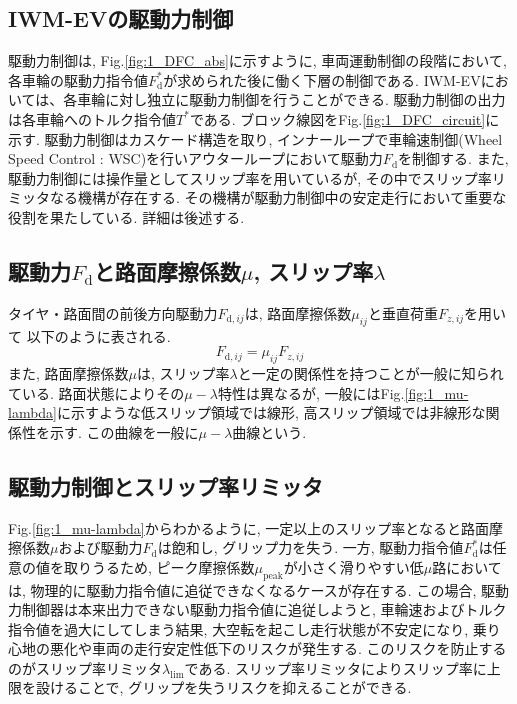 \documentclass[11pt,a4paper,oneside,onecolumn,fleqn,dvipdfmx]{jsarticle}
\begin{document}
\subsection{IWM-EVの駆動力制御}
駆動力制御は, Fig.\ref{fig:1_DFC_abs}に示すように, 車両運動制御の段階において, 各車輪の駆動力指令値$F_\mathrm{d}^*$が求められた後に働く下層の制御である.
IWM-EVにおいては、各車輪に対し独立に駆動力制御を行うことができる.
駆動力制御の出力は各車輪へのトルク指令値$T^*$である. 
ブロック線図をFig.\ref{fig:1_DFC_circuit}に示す. 駆動力制御はカスケード構造を取り, インナーループで車輪速制御(Wheel Speed Control : WSC)を行いアウターループにおいて駆動力$F_\mathrm{d}$を制御する.
また, 駆動力制御には操作量としてスリップ率を用いているが, その中でスリップ率リミッタなる機構が存在する. その機構が駆動力制御中の安定走行において重要な役割を果たしている. 詳細は後述する.

\subsection{駆動力$F_\mathrm{d}$と路面摩擦係数$\mu$, スリップ率$\lambda$}
タイヤ・路面間の前後方向駆動力$F_{\mathrm{d},ij}$は, 路面摩擦係数$\mu_{ij}$と垂直荷重$F_{z,ij}$を用いて
以下のように表される.
\begin{equation}
    \label{eq:1_Fd}
    F_{\mathrm{d},ij} = \mu_{ij} F_{z,ij}
\end{equation}
また, 路面摩擦係数$\mu$は, スリップ率$\lambda$と一定の関係性を持つことが一般に知られている. 
路面状態によりその$\mu-\lambda$特性は異なるが, 一般にはFig.\ref{fig:1_mu-lambda}に示すような低スリップ領域では線形, 高スリップ領域では非線形な関係性を示す. 
この曲線を一般に$\mu-\lambda$曲線という.


\subsection{駆動力制御とスリップ率リミッタ}
Fig.\ref{fig:1_mu-lambda}からわかるように, 一定以上のスリップ率となると路面摩擦係数$\mu$および駆動力$F_\mathrm{d}$は飽和し, グリップ力を失う. 
一方, 駆動力指令値$F_\mathrm{d}^*$は任意の値を取りうるため, ピーク摩擦係数$\mu_\mathrm{peak}$が小さく滑りやすい低$\mu$路においては, 物理的に駆動力指令値に追従できなくなるケースが存在する. 
この場合, 駆動力制御器は本来出力できない駆動力指令値に追従しようと, 車輪速およびトルク指令値を過大にしてしまう結果, 大空転を起こし走行状態が不安定になり, 乗り心地の悪化や車両の走行安定性低下のリスクが発生する. 
このリスクを防止するのがスリップ率リミッタ$\lambda_\mathrm{lim}$である. 
スリップ率リミッタによりスリップ率に上限を設けることで, グリップを失うリスクを抑えることができる. 
\end{document}
